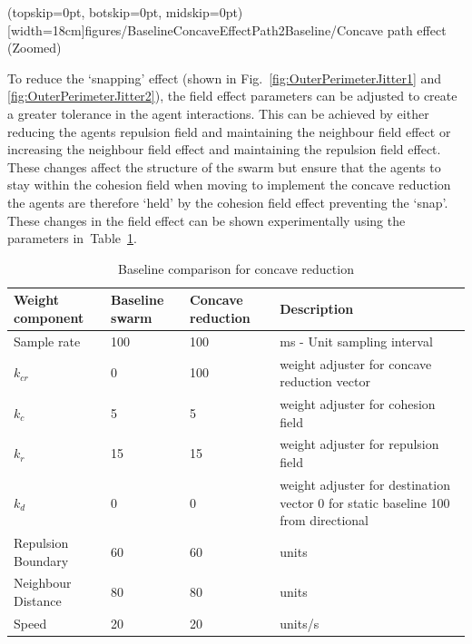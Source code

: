 \documentclass{ieeeaccess}
\begin{document}
\Figure[t!](topskip=0pt, botskip=0pt, midskip=0pt)[width=18cm]{figures/BaselineConcaveEffectPath2}{Baseline/Concave path effect (Zoomed)\label{concave:BaselineConcaveEffectPath2}}

To reduce the `snapping' effect (shown in Fig.~\ref{fig:OuterPerimeterJitter1} and \ref{fig:OuterPerimeterJitter2}), the field effect parameters can be adjusted to create a greater tolerance in the agent interactions. This can be achieved by either reducing the agents repulsion field and maintaining the neighbour field effect or increasing the neighbour field effect and maintaining the repulsion field effect. These changes affect the structure of the swarm but ensure that the agents to stay within the cohesion field when moving to implement the concave reduction the agents are therefore `held' by the cohesion field effect preventing the `snap'. These changes in the field effect can be shown experimentally using the parameters in~Table~\ref{tab:BaselineConcaveReduction2}. 

\begin{table}
\caption{Baseline comparison for concave reduction} 
\label{tab:BaselineConcaveReduction2}
\begin{center}
\begin{tabular}{| p{1.4cm} | p{1.2cm} | p{1.2cm} | p{2.5cm} |}
\hline
\bf Weight \bf component & \bf Baseline \bf swarm & \bf Concave \bf reduction & \bf Description \\ \hline
Sample rate & 100 & 100 & ms - Unit sampling interval\\  \hline
$k_{cr}$ & 0 & 100 & weight adjuster for concave reduction vector\\  \hline
$k_c$ & 5 & 5 & weight adjuster for cohesion field\\  \hline
$k_r$ & 15 & 15 & weight adjuster for repulsion field\\  \hline
$k_d$ & 0 & 0 & weight adjuster for destination vector 0 for static baseline 100 from directional\\  \hline
Repulsion Boundary & 60 & 60 & units\\  \hline
Neighbour Distance & 80 & 80 & units\\  \hline
Speed & 20 & 20 & units/s\\  \hline
\end{tabular}
\end{center}
\end{table}
\end{document}
